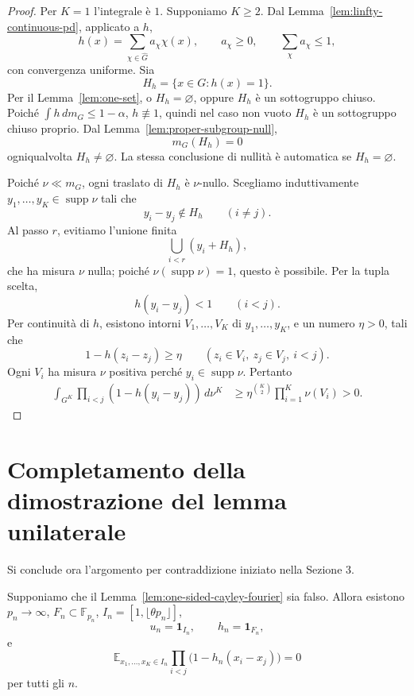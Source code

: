 \documentclass[11pt]{article}
\numberwithin{equation}{section}
\newcommand{\E}{\mathbb E}
\newcommand{\F}{\mathbb F}
\newcommand{\1}{\mathbf 1}
\newcommand{\supp}{\operatorname{supp}}
\begin{document}
\begin{proof}
Per \(K=1\) l'integrale è \(1\). Supponiamo \(K\ge2\). Dal Lemma~\ref{lem:linfty-continuous-pd}, applicato a \(h\),
\[
        h(x)=\sum_{\chi\in\widehat G}a_\chi\chi(x),
        \qquad
        a_\chi\ge0,
        \qquad
        \sum_\chi a_\chi\le1,
\]
con convergenza uniforme. Sia
\[
        H_h=\{x\in G:h(x)=1\}.
\]
Per il Lemma~\ref{lem:one-set}, o \(H_h=\varnothing\), oppure \(H_h\) è un sottogruppo chiuso. Poiché \(\int h\,dm_G\le1-\alpha\), \(h\not\equiv1\), quindi nel caso non vuoto \(H_h\) è un sottogruppo chiuso proprio. Dal Lemma~\ref{lem:proper-subgroup-null},
\[
        m_G(H_h)=0
\]
ogniqualvolta \(H_h\ne\varnothing\). La stessa conclusione di nullità è automatica se \(H_h=\varnothing\).

Poiché \(\nu\ll m_G\), ogni traslato di \(H_h\) è \(\nu\)-nullo. Scegliamo induttivamente \(y_1,\ldots,y_K\in\supp\nu\) tali che
\[
        y_i-y_j\notin H_h
        \qquad(i\ne j).
\]
Al passo \(r\), evitiamo l'unione finita
\[
        \bigcup_{i<r}(y_i+H_h),
\]
che ha misura \(\nu\) nulla; poiché \(\nu(\supp\nu)=1\), questo è possibile. Per la tupla scelta,
\[
        h(y_i-y_j)<1
        \qquad(i<j).
\]
Per continuità di \(h\), esistono intorni \(V_1,\ldots,V_K\) di \(y_1,\ldots,y_K\), e un numero \(\eta>0\), tali che
\[
        1-h(z_i-z_j)\ge\eta
        \qquad
        (z_i\in V_i,
        \ z_j\in V_j,
        \ i<j).
\]
Ogni \(V_i\) ha misura \(\nu\) positiva perché \(y_i\in\supp\nu\). Pertanto
\[
\begin{aligned}
        \int_{G^K}
        \prod_{i<j}(1-h(y_i-y_j))\,d\nu^K
        &\ge
        \eta^{\binom K2}\prod_{i=1}^K\nu(V_i)>0.
\end{aligned}
\]
\end{proof}

\section{Completamento della dimostrazione del lemma unilaterale}

Si conclude ora l'argomento per contraddizione iniziato nella Sezione 3.

Supponiamo che il Lemma~\ref{lem:one-sided-cayley-fourier} sia falso. Allora esistono \(p_n\to\infty\), \(F_n\subset\F_{p_n}\), \(I_n=[1,\lfloor\theta p_n\rfloor]\),
\[
        u_n=\1_{I_n},
        \qquad
        h_n=\1_{F_n},
\]
e
\[
        \E_{x_1,\ldots,x_K\in I_n}
        \prod_{i<j}
        \bigl(1-h_n(x_i-x_j)\bigr)=0
\]
per tutti gli \(n\).
\end{document}
